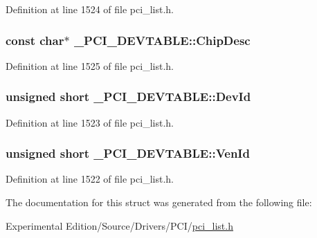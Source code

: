 Definition at line 1524 of file pci\+\_\+list.\+h.

\subsubsection[{\texorpdfstring{Chip\+Desc}{ChipDesc}}]{\setlength{\rightskip}{0pt plus 5cm}const char$\ast$ \+\_\+\+P\+C\+I\+\_\+\+D\+E\+V\+T\+A\+B\+L\+E\+::\+Chip\+Desc}\hypertarget{struct__PCI__DEVTABLE_aa93c23c253df7ff6365b332220f447ec}{}\label{struct__PCI__DEVTABLE_aa93c23c253df7ff6365b332220f447ec}


Definition at line 1525 of file pci\+\_\+list.\+h.

\subsubsection[{\texorpdfstring{Dev\+Id}{DevId}}]{\setlength{\rightskip}{0pt plus 5cm}unsigned short \+\_\+\+P\+C\+I\+\_\+\+D\+E\+V\+T\+A\+B\+L\+E\+::\+Dev\+Id}\hypertarget{struct__PCI__DEVTABLE_a843e7019bff5cda0c58a061814dfdbe6}{}\label{struct__PCI__DEVTABLE_a843e7019bff5cda0c58a061814dfdbe6}


Definition at line 1523 of file pci\+\_\+list.\+h.

\subsubsection[{\texorpdfstring{Ven\+Id}{VenId}}]{\setlength{\rightskip}{0pt plus 5cm}unsigned short \+\_\+\+P\+C\+I\+\_\+\+D\+E\+V\+T\+A\+B\+L\+E\+::\+Ven\+Id}\hypertarget{struct__PCI__DEVTABLE_acab5aacfc4cdfc1f3c71e9f835c52a61}{}\label{struct__PCI__DEVTABLE_acab5aacfc4cdfc1f3c71e9f835c52a61}


Definition at line 1522 of file pci\+\_\+list.\+h.



The documentation for this struct was generated from the following file\+:\begin{DoxyCompactItemize}
\item 
Experimental Edition/\+Source/\+Drivers/\+P\+C\+I/\hyperlink{pci__list_8h}{pci\+\_\+list.\+h}\end{DoxyCompactItemize}
